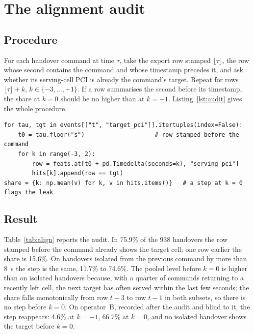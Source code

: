 \documentclass[5p,times,twocolumn]{elsarticle}
\begin{document}
\section{The alignment audit}
\label{sec:audit}

\subsection{Procedure}
For each handover command at time $\tau$, take the export row stamped $\lfloor\tau\rfloor$, the row whose second contains the command and whose timestamp precedes it, and ask whether its serving-cell PCI is already the command's target. Repeat for rows $\lfloor\tau\rfloor + k$, $k\in\{-3,\dots,+1\}$. If a row summarises the second before its timestamp, the share at $k=0$ should be no higher than at $k=-1$. Listing~\ref{lst:audit} gives the whole procedure.

\begin{lstlisting}[caption={The alignment audit (pandas). \texttt{feats}: one row per export second; \texttt{events}: decoded handover commands with target PCI.},label={lst:audit},float=t]
for tau, tgt in events[["t", "target_pci"]].itertuples(index=False):
    t0 = tau.floor("s")                    # row stamped before the command
    for k in range(-3, 2):
        row = feats.at[t0 + pd.Timedelta(seconds=k), "serving_pci"]
        hits[k].append(row == tgt)
share = {k: np.mean(v) for k, v in hits.items()}   # a step at k = 0 flags the leak
\end{lstlisting}

\subsection{Result}
Table~\ref{tab:align} reports the audit. In 75.9\% of the 938 handovers the row stamped before the command already shows the target cell; one row earlier the share is 15.6\%. On handovers isolated from the previous command by more than 8~s the step is the same, 11.7\% to 74.6\%. The pooled level before $k=0$ is higher than on isolated handovers because, with a quarter of commands returning to a recently left cell, the next target has often served within the last few seconds; the share falls monotonically from row $t-3$ to row $t-1$ in both subsets, so there is no step before $k=0$. On operator~B, recorded after the audit and blind to it, the step reappears: 4.6\% at $k=-1$, 66.7\% at $k=0$, and no isolated handover shows the target before $k=0$.
\end{document}
